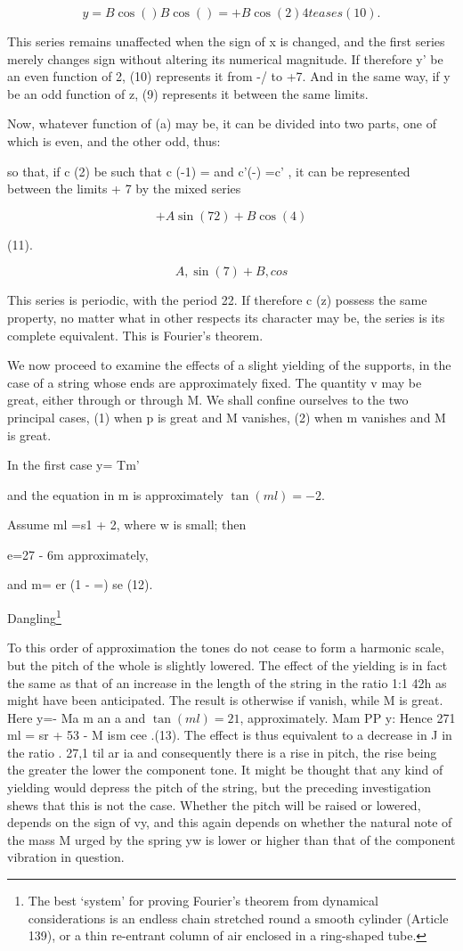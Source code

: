 \[y = B \cos() B \cos() = + B \cos(2) 4 teases (10).\]

This series remains unaffected when the sign of x is changed, and the first
series merely changes sign without altering its numerical magnitude. If
therefore y' be an even function of 2, (10) represents it from -/ to +7. And in
the same way, if y be an odd function of z, (9) represents it between the same
limits.

Now, whatever function of (a) may be, it can be divided into two parts, one of
which is even, and the other odd, thus:

so that, if c (2) be such that c (-1) = and c'(-) =c' , it can be represented
between the limits + 7 by the mixed series

\[+ A \sin(72) + B \cos(4)\]

(11).

\[A, \sin(7) +B, cos\]

This series is periodic, with the period 22. If therefore c (z) possess the
same property, no matter what in other respects its character may be, the
series is its complete equivalent. This is Fourier's theorem.

We now proceed to examine the effects of a slight yielding of the supports, in
the case of a string whose ends are approximately fixed.  The quantity v may be
great, either through or through M. We shall confine ourselves to the two
principal cases, (1) when p is great and M vanishes, (2) when m vanishes and M
is great.

In the first case y= Tm'

and the equation in m is approximately \(\tan(ml) = -2\).

Assume ml =s1 + 2, where w is small; then

e=27 - 6m approximately,

and m= er (1 - =) se (12).

Dangling\footnote{ The best `system' for proving Fourier's theorem from dynamical
considerations is an endless chain stretched round a smooth cylinder (Article 139),
or a thin re-entrant column of air enclosed in a ring-shaped tube.}

To this order of approximation the tones do not cease to form a harmonic scale,
but the pitch of the whole is slightly lowered. The effect of the yielding is
in fact the same as that of an increase in the length of the string in the
ratio 1:1 42h as might have been anticipated. The result is otherwise if
vanish, while M is great. Here y=- Ma m an a and \(\tan(ml) = 21\),
approximately. Mam PP y: Hence 271 ml = sr + 53 - M ism cee .(13). The effect
is thus equivalent to a decrease in J in the ratio . 27,1 til ar ia and
consequently there is a rise in pitch, the rise being the greater the lower the
component tone. It might be thought that any kind of yielding would depress the
pitch of the string, but the preceding investigation shews that this is not the
case. Whether the pitch will be raised or lowered, depends on the sign of vy,
and this again depends on whether the natural note of the mass M urged by the
spring yw is lower or higher than that of the component vibration in question.

